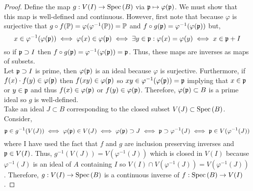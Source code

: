\documentclass[12pt]{article}
\begin{document}
\begin{enumerate}
\begin{proof}
Define the map $g : V(I) \to \Spec{B}$ via $\p \mapsto \varphi(\p)$. We must show that this map is well-defined and continuous. However, first note that because $\varphi$ is surjective that 
$g \circ f(\P) = \varphi(\varphi^{-1}(\P)) = \P$
and $f \circ g(\p) = \varphi^{-1}(\varphi(\p))$ but,
\[ x \in \varphi^{-1}(\varphi(\p)) \iff \varphi(x) \in \varphi(\p) \iff \exists y \in \p : \varphi(x) = \varphi(y) \iff x \in \p + I \]
so if $\p \supset I$ then $f \circ g(\p) = \varphi^{-1}(\varphi(\p)) = \p$. Thus, these maps are inverses as maps of subsets.
\bigskip\\
Let $\p \supset I$ is prime, then $\varphi(\p)$ is an ideal because $\varphi$ is surjective. Furthermore, if $f(x) \cdot f(y) \in \varphi(\p)$ then $f(xy) \in \varphi(\p)$ so $xy \in \varphi^{-1}(\varphi(\p)) = \p$ implying that $x \in \p$ or $y \in \p$ and thus $f(x) \in \varphi(\p)$ or $f(y) \in \varphi(\p)$. Therefore, $\varphi(\p) \subset B$ is a prime ideal so $g$ is well-defined. 
\bigskip\\
Take an ideal $J \subset B$ corresponding to the closed subset $V(J) \subset \Spec{B}$. Consider,
\[ \p \in g^{-1}(V(J)) \iff \varphi(\p) \in V(J) \iff \varphi(\p) \supset J \iff \p \supset \varphi^{-1}(J) \iff \p \in V(\varphi^{-1}(J)) \]
where I have used the fact that $f$ and $g$ are inclusion preserving inverses and $\p \in V(I)$. Thus, $g^{-1}(V(J)) = V(\varphi^{-1}(J))$ which is closed in $V(I)$ because $\varphi^{-1}(J)$ is an ideal of $A$ containing $I$ so $V(I) \cap V(\varphi^{-1}(J)) = V(\varphi^{-1}(J))$. Therefore, $g : V(I) \to \Spec{B}$ is a continuous inverse of $f : \Spec{B} \to V(I)$. 
\end{proof}


\end{enumerate}
\end{document}
